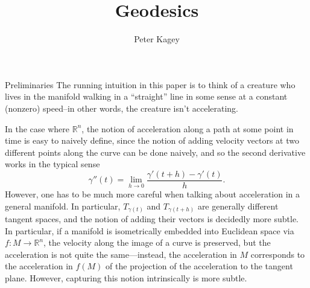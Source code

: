 \documentclass{article}
\newcommand{\fn}[3]{#1 \colon #2 \rightarrow #3}
\theoremstyle{definition}
\theoremstyle{remark}
\begin{document}
\title{Geodesics}
\author{Peter Kagey}

\maketitle

\begin{section}{Preliminaries}
  The running intuition in this paper is to think of a creature who lives in the
  manifold walking in a ``straight'' line in some sense at a constant
  (nonzero) speed--in other words, the creature isn't accelerating.

  In the case where $\mathbb R^n$, the notion of acceleration along a path at
  some point in time is easy to naively define, since the notion of adding
  velocity vectors at two different points along the curve can be done naively,
  and so the second derivative works in the typical sense \[
    \gamma''(t) = \lim_{h \rightarrow 0} \frac{\gamma'(t + h) - \gamma'(t)}{h}.
  \] However, one has to be much more careful when talking about acceleration
  in a general manifold. In particular, $T_{\gamma(t)}$ and $T_{\gamma(t+h)}$ are
  generally different tangent spaces, and the notion of adding their vectors is
  decidedly more subtle. In particular, if a manifold is isometrically embedded
  into Euclidean space via $\fn f M {\mathbb R^n}$, the velocity along the image
  of a curve is preserved, but the acceleration is not quite the same---instead,
  the acceleration in $M$ corresponds to the acceleration in $f(M)$
  of the projection of the acceleration to the tangent plane.
  However, capturing this notion intrinsically is more subtle.



\end{section}
\end{document}
